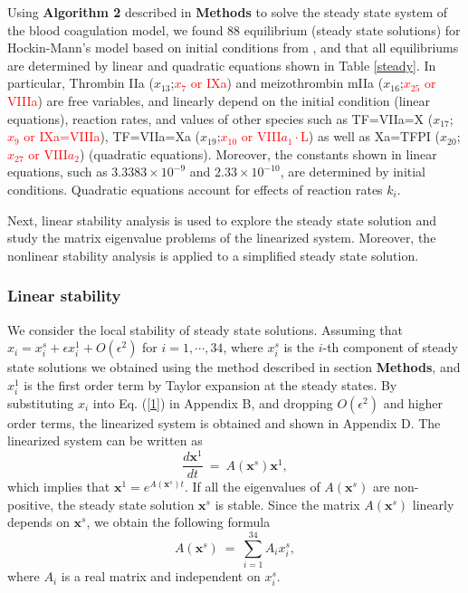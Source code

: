 Using \textbf{Algorithm 2} described in \textbf{Methods} to solve the steady state system of the
blood coagulation model, we found $88$ equilibrium (steady state
solutions) for Hockin-Mann's model based on initial conditions from
\cite{HocJon02}, and that all equilibriums are determined by linear
and quadratic equations shown in Table \ref{steady}. In particular,
Thrombin IIa ($x_{13}$;\textcolor{red}{$x_{7}$ or IXa}) and meizothrombin mIIa ($x_{16}$;\textcolor{red}{$x_{25}$ or VIIIa}) are free
variables, and linearly depend on the initial condition (linear
equations), reaction rates, and values of other species such as
TF=VIIa=X ($x_{17}$;\textcolor{red}{$x_{9}$ or IXa=VIIIa}), TF=VIIa=Xa ($x_{19}$;\textcolor{red}{$x_{10}$ or VIII$a_1\cdot$L}) as well as Xa=TFPI
($x_{20}$;\textcolor{red}{$x_{27}$ or VIII$a_2$}) (quadratic equations). Moreover, the constants shown in
linear equations, such as $3.3383\times10^{-9}$ and
$2.33\times10^{-10}$, are determined by initial conditions.
Quadratic equations account for effects of reaction rates $k_i$.

Next, linear stability analysis is used to explore the steady state
solution and study the matrix eigenvalue problems of the linearized
system. Moreover, the nonlinear stability analysis is applied to a
simplified steady state solution.

\subsubsection*{Linear stability}
We consider the local stability of steady state solutions. Assuming
that $x_i=x_i^s+\epsilon x_i^1+O(\epsilon^2)$ for $ i =
1,\cdots,34$, where $x_i^s$ is the $i$-th component of steady state
solutions we obtained using the method described in section {\bf
Methods}, and $x_i^1$ is the first order term by Taylor expansion at
the steady states. By substituting $x_i$ into Eq. (\ref{1}) in
Appendix B, and dropping $O(\epsilon^2)$ and higher order terms, the
linearized system is obtained and shown in Appendix D. The
linearized system can be written as
\[\frac{d\mathbf{x}^1}{dt}~=~A(\mathbf{x}^s)\mathbf{x}^1,\]
which implies that $\mathbf{x}^1=e^{A(\mathbf{x}^s)t}$. If all the
eigenvalues of $A(\mathbf{x}^s)$ are non-positive, the steady state
solution $\mathbf{x}^s$ is stable. Since the matrix
$A(\mathbf{x}^s)$ linearly depends on $\mathbf{x}^s$, we obtain the
following formula
\[A(\mathbf{x}^s)~=~\sum_{i=1}^{34} A_i x^s_i,\]
where $A_i$ is a real matrix and independent on $x^s_i$.

